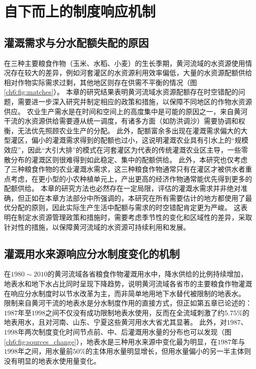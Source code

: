 \section{自下而上的制度响应机制}

\subsection{灌溉需求与分水配额失配的原因}

在三种主要粮食作物（玉米、水稻、小麦）的生长季期，黄河流域的水资源使用情况存在较大的差异，例如河套灌区的水资源利用效率偏低，大量的水资源配额供给相对作物实际需求过剩，其他地区则存在供需不平衡的情况（图\ref{ch6:fig:matches}）。
本章的研究结果表明黄河流域水资源配额存在时空错配的问题，需要进一步深入研究并制定相应的政策和措施，以保障不同地区的作物水资源供应。
农业生产需水是在时间和空间上的高度集中是可能的原因之一，来自黄河干流的水资源供给需要遵从统一调度，有诸多方面（如防洪调沙）需要协调和权衡，无法优先照顾农业生产的分配。
此外，配额富余多出现在灌溉需求偏大的大型灌区，偏小的灌溉需求得到的配额也过小，这说明灌溉农业具有引水上的“规模效应”，因此“大引大排”的模式在河套灌区为代表的传统灌溉农业区主导，一些零散分布的灌溉区则很难得到如此稳定、集中的配额供给。
此外，本研究也仅考虑了三种粮食作物的农业灌溉水需求，这三种粮食作物通常只有在灌区才被供水者重点考虑，在更小型的小农种植单元上，产出更高的经济作物通常能优先得到更多的配额供给。
本章的研究方法也必然存在一定局限，评估的灌溉水需求并非绝对准确，但正如在本章方法部分中所强调的，本研究在所有需要估计的地方都使用了最优分配的原则，因此实际生产生活中配额与需求的时空错配肯定更为严峻。
这表明在制定水资源管理政策和措施时，需要考虑季节性的变化和区域性的差异，采取针对性的措施，以保障黄河流域的水资源可持续利用和发展。


\subsection{灌溉用水来源响应分水制度变化的机制}

在$1980 \sim 2010$的黄河流域各省粮食作物灌溉用水中，降水供给的比例持续增加，地表水和地下水占比同时呈现下降趋势，说明黄河流域各省市的主要粮食作物灌溉在响应分水制度时以节水改革为主，而非简单地用地下水替代被限制的地表水。
限制来自黄河干流的地表水是分水制度作用的直接方式，但正如第五章已论述的：$1987$年至$1998$之间不仅没有成功限制地表水使用，反而在全流域刺激了约$5.75\%$的地表用水，且对河南、山东、宁夏这些黄河用水大省尤其显著。
此外，对$1987$、$1998$年两次制度变化时间节点前、中、后灌溉用水量的分布也可以发现（图\ref{ch6:fig:sources_change}），地表水是三种用水来源中变化最为明显，在$1987$年与$1998$年之间，用水量前$50\%$的主体用水量明显增长，但用水量偏小的另一半主体则没有明显的地表水使用量变化。

